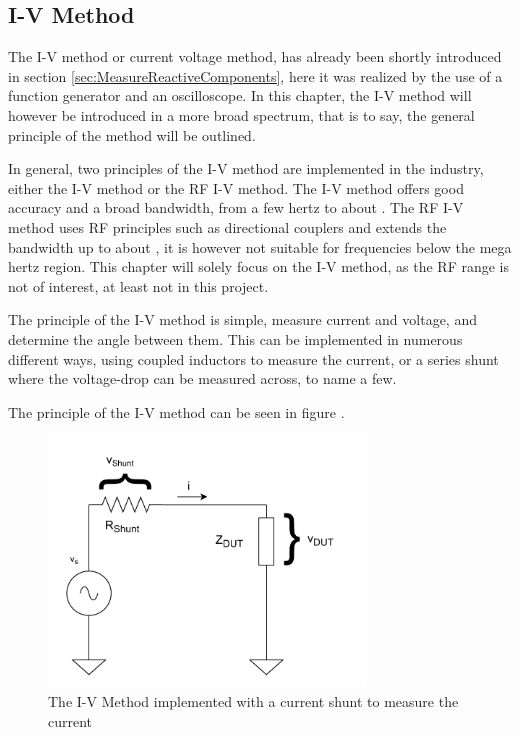 \subsection{I-V Method} \label{ssec:IVMethod}
The I-V method or current voltage method, has already been shortly introduced in section \ref{sec:MeasureReactiveComponents}, here it was realized by the use of a function generator and an oscilloscope. In this chapter, the I-V method will however be introduced in a more broad spectrum, that is to say, the general principle of the method will be outlined.

In general, two principles of the I-V method are implemented in the industry, either the I-V method or the RF I-V method. The I-V method offers good accuracy 
and a broad bandwidth, from a few hertz to about . The RF I-V method uses RF principles such as directional couplers and extends the bandwidth up to about , it is however not suitable for frequencies below the mega hertz region. This chapter will solely focus on the I-V method, as the RF range is not of interest, at least not in this project.

The principle of the I-V method is simple, measure current and voltage, and determine the angle between them. This can be implemented in numerous different ways, using coupled inductors to measure the current, or a series shunt where the voltage-drop can be measured across, to name a few. 

The principle of the I-V method can be seen in figure .

\begin{figure}[H]
    \centering
    \includegraphics[width=0.75\textwidth]{Sections/4_TechnicalAnalysis/Figures_JFT/IV_Method.pdf}
    \caption{The I-V Method implemented with a current shunt to measure the current}
    \label{fig_4_2_IVMethod}
\end{figure}